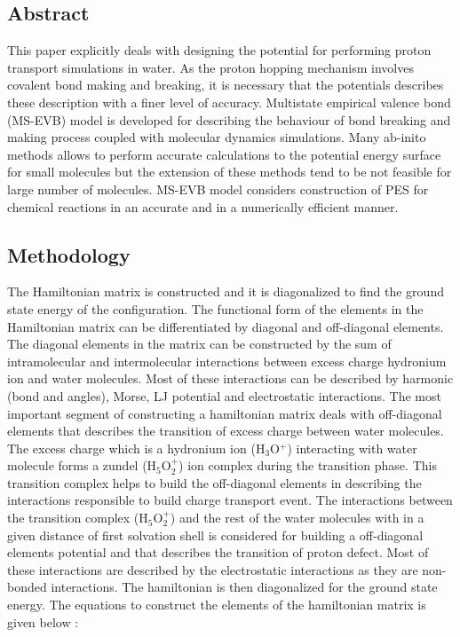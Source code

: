 \documentclass{article}
\begin{document}
\subsection{Abstract}
\label{sec-2-1}
This paper explicitly deals with designing the potential for performing proton transport simulations in water. As the proton hopping mechanism involves covalent bond making and breaking, it is necessary that the potentials describes these description with a finer level of accuracy. Multistate empirical valence bond (MS-EVB) model is developed for describing the behaviour of bond breaking and making process coupled with molecular dynamics simulations. Many ab-inito methods allows to perform accurate calculations to the potential energy surface for small molecules but the extension of these methods tend to be not feasible for large number of molecules. MS-EVB model considers construction of PES for chemical reactions in an accurate and in a numerically efficient manner.

\subsection{Methodology}
\label{sec-2-2}
The Hamiltonian matrix is constructed and it is diagonalized to find the ground state energy of the configuration. The functional form of the elements in the Hamiltonian matrix can be differentiated by diagonal and off-diagonal elements. The diagonal elements in the matrix can be constructed by the sum of intramolecular and intermolecular interactions between excess charge hydronium ion and water molecules. Most of these interactions can be described by harmonic (bond and angles), Morse, LJ potential and electrostatic interactions. The most important segment of constructing a hamiltonian matrix deals with off-diagonal elements that describes the transition of excess charge between water molecules. The excess charge which is a hydronium ion (H$_{\text{3}}$O$^{\text{+}}$) interacting with water molecule forms a zundel (H$_{\text{5}}$O$_{\text{2}}^{\text{+}}$) ion complex during the transition phase. This transition complex helps to build the off-diagonal elements in describing the interactions responsible to build charge transport event. The interactions between the transition complex (H$_{\text{5}}$O$_{\text{2}}^{\text{+}}$) and the rest of the water molecules with in a given distance of first solvation shell is considered for building a off-diagonal elements potential and that describes the transition of proton defect. Most of these interactions are described by the electrostatic interactions as they are non-bonded interactions. The hamiltonian is then diagonalized for the ground state energy. The equations to construct the elements of the hamiltonian matrix is given below : 
\end{document}
